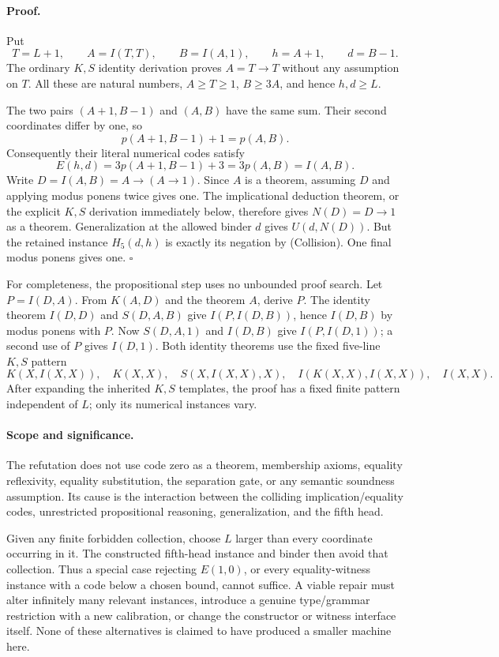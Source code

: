 \paragraph{Proof.}
Put
\[
 T=L+1,\qquad A=I(T,T),\qquad B=I(A,1),\qquad
 h=A+1,\qquad d=B-1.
\]
The ordinary $K,S$ identity derivation proves $A=T\to T$ without any
assumption on $T$. All these are natural numbers, $A\geq T\geq1$,
$B\geq3A$, and hence $h,d\geq L$.

The two pairs $(A+1,B-1)$ and $(A,B)$ have the same sum. Their second
coordinates differ by one, so
\[
 p(A+1,B-1)+1=p(A,B).
\]
Consequently their literal numerical codes satisfy
\[
 E(h,d)=3p(A+1,B-1)+3
       =3p(A,B)=I(A,B).                                     \tag{Collision}
\]
Write $D=I(A,B)=A\to(A\to1)$. Since $A$ is a theorem, assuming $D$
and applying modus ponens twice gives one. The implicational deduction
theorem, or the explicit $K,S$ derivation immediately below, therefore
gives $N(D)=D\to1$ as a theorem. Generalization at the allowed binder
$d$ gives $U(d,N(D))$. But the retained instance $H_5(d,h)$ is exactly
its negation by (Collision). One final modus ponens gives one.
\hfill$\square$

For completeness, the propositional step uses no unbounded proof search.
Let $P=I(D,A)$. From $K(A,D)$ and the theorem $A$, derive $P$.
The identity theorem $I(D,D)$ and $S(D,A,B)$ give
$I(P,I(D,B))$, hence $I(D,B)$ by modus ponens with $P$.
Now $S(D,A,1)$ and $I(D,B)$ give $I(P,I(D,1))$; a second use of $P$
gives $I(D,1)$. Both identity theorems use the fixed five-line $K,S$
pattern
\[
 K(X,I(X,X)),\quad K(X,X),\quad S(X,I(X,X),X),\quad
 I(K(X,X),I(X,X)),\quad I(X,X).
\]
After expanding the inherited $K,S$ templates, the proof has a fixed
finite pattern independent of $L$; only its numerical instances vary.

\paragraph{Scope and significance.}
The refutation does not use code zero as a theorem, membership axioms,
equality reflexivity, equality substitution, the separation gate, or any
semantic soundness assumption. Its cause is the interaction between
the colliding implication/equality codes, unrestricted propositional
reasoning, generalization, and the fifth head.

Given any finite forbidden collection, choose $L$ larger than every
coordinate occurring in it. The constructed fifth-head instance and
binder then avoid that collection. Thus a special case rejecting
$E(1,0)$, or every equality-witness instance with a code below a chosen
bound, cannot suffice. A viable
repair must alter infinitely many relevant instances, introduce a genuine
type/grammar restriction with a new calibration, or change the constructor
or witness interface itself. None of these alternatives is claimed to
have produced a smaller machine here.

